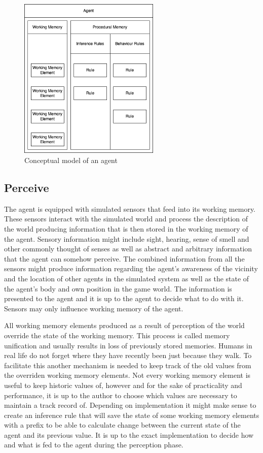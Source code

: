 \begin{figure}[H]
    \centering
    \includegraphics[width=0.6\textwidth]{images/chapter1/agent.drawio.png}
    \caption{Conceptual model of an agent}\label{fig:agent.drawio.png}
\end{figure}

\subsection{Perceive}

The agent is equipped with simulated sensors that feed into its working memory.
These sensors interact with the simulated world and process the description of the world producing information that is then stored in the working memory of the agent.
Sensory information might include sight, hearing, sense of smell and other commonly thought of senses as well as abstract and arbitrary information that the agent can somehow perceive.
The combined information from all the sensors might produce information regarding the agent's awareness of the vicinity and the location of other agents in the simulated system as well as the state of the agent's body and own position in the game world.
The information is presented to the agent and it is up to the agent to decide what to do with it.
Sensors may only influence working memory of the agent.

All working memory elements produced as a result of perception of the world override the state of the working memory.
This process is called memory unification and usually results in loss of previously stored memories.
Humans in real life do not forget where they have recently been just because they walk.
To facilitate this another mechanism is needed to keep track of the old values from the overriden working memory elements.
Not every working memory element is useful to keep historic values of, however and for the sake of practicality and performance, it is up to the author to choose which values are necessary to maintain a track record of.
Depending on implementation it might make sense to create an inference rule that will save the state of some working memory elements with a prefix to be able to calculate change between the current state of the agent and its previous value.
It is up to the exact implementation to decide how and what is fed to the agent during the perception phase.

